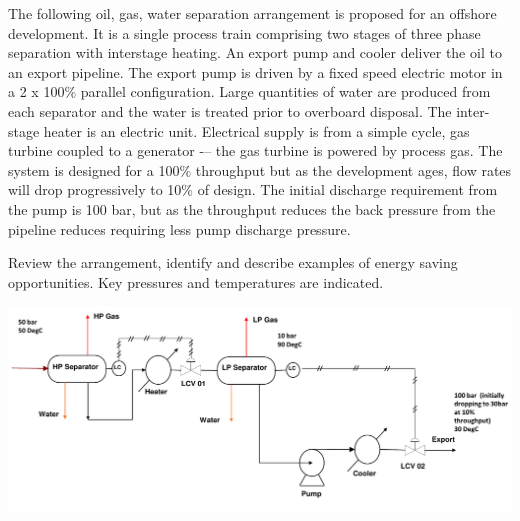 \documentclass[calculator,datasheet]{exam}
\begin{document}
\begin{question} 

The following oil, gas, water separation arrangement is proposed for an offshore development. It is a single process train comprising two stages of three phase separation with interstage heating. An export pump and cooler deliver the oil to an export pipeline. The export pump is driven by a fixed speed electric motor in a 2 x 100$\%$ parallel configuration. Large quantities of water are produced from each separator and the water is treated prior to overboard disposal. The inter-stage heater is an electric unit. Electrical supply is from a simple cycle, gas turbine coupled to a generator -– the gas turbine is powered by process gas. The system is designed for a 100$\%$ throughput but as the development ages, flow rates will drop progressively to 10$\%$ of design.  The initial discharge requirement from the pump is 100 bar, but as the throughput reduces the back pressure from the pipeline reduces requiring less pump discharge pressure.

Review the arrangement, identify and describe examples of energy saving opportunities. Key pressures and temperatures are indicated.~
\begin{center}
\includegraphics[width=\columnwidth]{./Pics/EG5597_Process_1_May_2014-5.pdf}
\end{center} 


\end{question}

\clearpage
\end{document}
